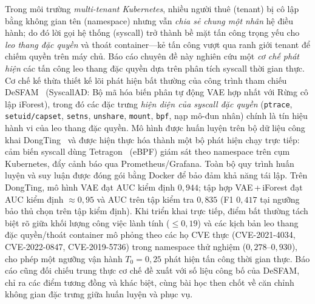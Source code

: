 Trong môi trường \emph{multi-tenant Kubernetes}, nhiều người thuê (tenant) bị cô
lập bằng không gian tên (namespace) nhưng vẫn \emph{chia sẻ chung một nhân} hệ điều
hành; do đó lời gọi hệ thống (syscall) trở thành bề mặt tấn công trọng yếu cho
\emph{leo thang đặc quyền} và thoát container---kẻ tấn công vượt qua ranh giới
tenant để chiếm quyền trên máy chủ. Báo cáo chuyên đề này nghiên cứu một
\emph{cơ chế phát hiện} các tấn công leo thang đặc quyền dựa trên phân tích syscall
thời gian thực. Cơ chế kế thừa thiết kế lõi phát hiện bất thường của công trình
tham chiếu DeSFAM~\cite{desfam_original} (SyscallAD: Bộ mã hóa biến phân tự động VAE
hợp nhất với Rừng cô lập iForest), trong đó các đặc trưng \emph{hiện diện của syscall
đặc quyền} (\texttt{ptrace}, \texttt{setuid/capset}, \texttt{setns},
\texttt{unshare}, \texttt{mount}, \texttt{bpf}, nạp mô-đun nhân) chính là tín hiệu
hành vi của leo thang đặc quyền. Mô hình được huấn luyện trên bộ dữ liệu công khai
DongTing~\cite{ref26_dongtingdataset} và được hiện thực hóa thành một bộ phát hiện
chạy trực tiếp: cảm biến syscall dùng Tetragon~\cite{tetragon} (eBPF) giám sát theo
namespace trên cụm Kubernetes, đẩy cảnh báo qua Prometheus/Grafana. Toàn bộ quy
trình huấn luyện và suy luận được đóng gói bằng Docker để bảo đảm khả năng tái lập.
Trên DongTing, mô hình VAE đạt AUC kiểm định $0{,}944$; tập hợp VAE\,+\,iForest đạt
AUC kiểm định $\approx 0{,}95$ và AUC trên tập kiểm tra $0{,}835$ (F1 $0{,}417$ tại
ngưỡng bảo thủ chọn trên tập kiểm định). Khi triển khai trực tiếp, điểm bất thường
tách biệt rõ giữa khối lượng công việc lành tính ($\le 0{,}19$) và các kịch bản leo
thang đặc quyền/thoát container mô phỏng theo các họ CVE thực
(\mbox{CVE-2021-4034}, \mbox{CVE-2022-0847}, \mbox{CVE-2019-5736}) trong namespace
thử nghiệm ($0{,}278$--$0{,}930$), cho phép một ngưỡng vận hành $T_0 = 0{,}25$ phát
hiện tấn công thời gian thực. Báo cáo cũng đối chiếu trung thực cơ chế đề xuất với
số liệu công bố của DeSFAM, chỉ ra các điểm tương đồng và khác biệt, cùng bài học
then chốt về căn chỉnh không gian đặc trưng giữa huấn luyện và phục vụ.
